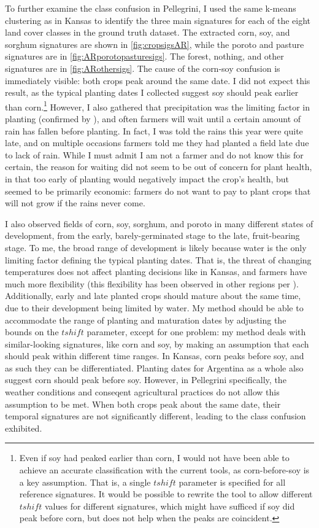 To further examine the class confusion in Pellegrini, I used the same k-means clustering as in Kansas to identify the three main signatures for each of the eight land cover classes in the ground truth dataset. The extracted corn, soy, and sorghum signatures are shown in \autoref{fig:cropsigsAR}, while the poroto and pasture signatures are in \autoref{fig:ARporotopasturesigs}. The forest, nothing, and other signatures are in \autoref{fig:ARothersigs}. The cause of the corn-soy confusion is immediately visible: both crops peak around the same date. I did not expect this result, as the typical planting dates I collected suggest soy should peak earlier than corn.\footnote{Even if soy had peaked earlier than corn, I would not have been able to achieve an accurate classification with the current tools, as corn-before-soy is a key assumption. That is, a single $tshift$ parameter is specified for all reference signatures. It would be possible to rewrite the tool to allow different $tshift$ values for different signatures, which might have sufficed if soy did peak before corn, but does not help when the peaks are coincident.} However, I also gathered that precipitation was the limiting factor in planting (confirmed by \autocite{sacks2010crop}), and often farmers will wait until a certain amount of rain has fallen before planting. In fact, I was told the rains this year were quite late, and on multiple occasions farmers told me they had planted a field late due to lack of rain. While I must admit I am not a farmer and do not know this for certain, the reason for waiting did not seem to be out of concern for plant health, in that too early of planting would negatively impact the crop's health, but seemed to be primarily economic: farmers do not want to pay to plant crops that will not grow if the rains never come.

I also observed fields of corn, soy, sorghum, and poroto in many different states of development, from the early, barely-germinated stage to the late, fruit-bearing stage. To me, the broad range of development is likely because water is the only limiting factor defining the typical planting dates. That is, the threat of changing temperatures does not affect planting decisions like in Kansas, and farmers have much more flexibility (this flexibility has been observed in other regions per \textcite{sacks2010crop}). Additionally, early and late planted crops should mature about the same time, due to their development being limited by water. My method should be able to accommodate the range of planting and maturation dates by adjusting the bounds on the $tshift$ parameter, except for one problem: my method deals with similar-looking signatures, like corn and soy, by making an assumption that each should peak within different time ranges. In Kansas, corn peaks before soy, and as such they can be differentiated. Planting dates for Argentina as a whole also suggest corn should peak before soy. However, in Pellegrini specifically, the weather conditions and conseqent agricultural practices do not allow this assumption to be met. When both crops peak about the same date, their temporal signatures are not significantly different, leading to the class confusion exhibited.

